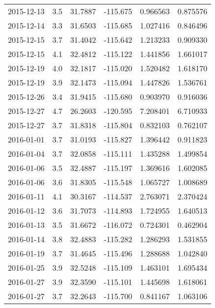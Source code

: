 \begin{tabular}{lrrrrr}
2015-12-13 &       3.5 &  31.7887 &  -115.675 &         0.966563 &         0.875576 \\
2015-12-14 &       3.3 &  31.6503 &  -115.685 &         1.027416 &         0.846496 \\
2015-12-15 &       3.7 &  31.4042 &  -115.642 &         1.213233 &         0.909330 \\
2015-12-15 &       4.1 &  32.4812 &  -115.122 &         1.441856 &         1.661017 \\
2015-12-19 &       4.0 &  32.1817 &  -115.020 &         1.520482 &         1.618170 \\
2015-12-19 &       3.9 &  32.1473 &  -115.094 &         1.447826 &         1.536761 \\
2015-12-26 &       3.4 &  31.9415 &  -115.680 &         0.903970 &         0.916036 \\
2015-12-27 &       4.7 &  26.2603 &  -120.595 &         7.208401 &         6.710933 \\
2015-12-27 &       3.7 &  31.8318 &  -115.804 &         0.832103 &         0.762107 \\
2016-01-01 &       3.7 &  31.0193 &  -115.827 &         1.396442 &         0.911823 \\
2016-01-04 &       3.7 &  32.0858 &  -115.111 &         1.435288 &         1.499854 \\
2016-01-06 &       3.5 &  32.4887 &  -115.197 &         1.369616 &         1.602085 \\
2016-01-06 &       3.6 &  31.8305 &  -115.548 &         1.065727 &         1.008689 \\
2016-01-11 &       4.1 &  30.3167 &  -114.537 &         2.763071 &         2.370424 \\
2016-01-12 &       3.6 &  31.7073 &  -114.893 &         1.724955 &         1.640513 \\
2016-01-13 &       3.5 &  31.6672 &  -116.072 &         0.724301 &         0.462904 \\
2016-01-14 &       3.8 &  32.4883 &  -115.282 &         1.286293 &         1.531855 \\
2016-01-19 &       3.7 &  31.4645 &  -115.496 &         1.288688 &         1.042840 \\
2016-01-25 &       3.9 &  32.5248 &  -115.109 &         1.463101 &         1.695434 \\
2016-01-27 &       3.9 &  32.3590 &  -115.101 &         1.445698 &         1.618061 \\
2016-01-27 &       3.7 &  32.2643 &  -115.700 &         0.841167 &         1.063106 \\

\end{tabular}
